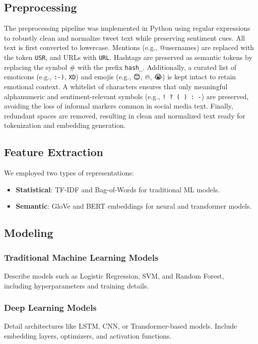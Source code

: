 \documentclass[10pt]{article}
\begin{document}
\subsection{Preprocessing}
The preprocessing pipeline was implemented in Python using regular expressions to robustly clean and normalize tweet text while preserving sentiment cues.
All text is first converted to lowercase. Mentions (e.g., @usernames) are replaced with the token \texttt{USR}, and URLs with \texttt{URL}.
Hashtags are preserved as semantic tokens by replacing the symbol \# with the prefix \texttt{hash\_}.
Additionally, a curated list of emoticons (e.g., \texttt{:-)}, \texttt{XD}) and emojis (e.g., 😊, 🔥, 😭) is kept intact to retain emotional context.
A whitelist of characters ensures that only meaningful alphanumeric and sentiment-relevant symbols (e.g., \texttt{! ? ( ) : -}) are preserved, avoiding the loss of informal markers common in social media text.
Finally, redundant spaces are removed, resulting in clean and normalized text ready for tokenization and embedding generation.

\subsection{Feature Extraction}
We employed two types of representations:
\begin{itemize}
    \item \textbf{Statistical}: TF-IDF and Bag-of-Words for traditional ML models.
    \item \textbf{Semantic}: GloVe and BERT embeddings for neural and transformer models.
\end{itemize}

\subsection{Modeling}
\subsubsection{Traditional Machine Learning Models}
Describe models such as Logistic Regression, SVM, and Random Forest, including hyperparameters and training details.

\subsubsection{Deep Learning Models}
Detail architectures like LSTM, CNN, or Transformer-based models. Include embedding layers, optimizers, and activation functions.
\end{document}
